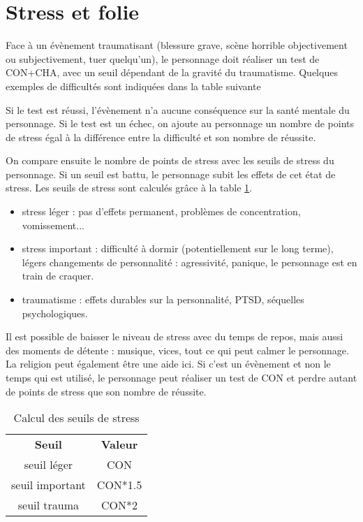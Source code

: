 \documentclass[10pt,a4paper,twocolumn]{book}
\begin{document}
\section{Stress et folie}
Face à un évènement traumatisant (blessure grave, scène horrible objectivement ou subjectivement, tuer quelqu'un), le personnage doit réaliser un test de CON+CHA, avec un seuil dépendant de la gravité du traumatisme. Quelques exemples de difficultés sont indiquées dans la table suivante %

Si le test est réussi, l'évènement n'a aucune conséquence sur la santé mentale du personnage. Si le test est un échec, on ajoute au personnage un nombre de points de stress égal à la différence entre la difficulté et son nombre de réussite.

On compare ensuite le nombre de points de stress avec les seuils de stress du personnage. Si un seuil est battu, le personnage subit les effets de cet état de stress. Les seuils de stress sont calculés grâce à la table \ref{TableauSeuilsStress}.

\begin{itemize}
\item stress léger : pas d'effets permanent, problèmes de concentration, vomissement...
\item stress important : difficulté à dormir (potentiellement sur le long terme), légers changements de personnalité : agressivité, panique, le personnage est en train de craquer.
\item traumatisme : effets durables sur la personnalité, PTSD, séquelles psychologiques.
\end{itemize}

Il est possible de baisser le niveau de stress avec du temps de repos, mais aussi des moments de détente : musique, vices, tout ce qui peut calmer le personnage. La religion peut également être une aide ici.
Si c'est un évènement et non le temps qui est utilisé, le personnage peut réaliser un test de CON et perdre autant de points de stress que son nombre de réussite.
\begin{table}
\label{TableauSeuilsStress}
\caption{Calcul des seuils de stress}
\begin{center}
\begin{tabular}{cc}
\textbf{Seuil} & \textbf{Valeur} \\
seuil léger & CON \\
seuil important & CON*1.5 \\
seuil trauma & CON*2 \\
\end{tabular}
\end{center}
\end{table}
\end{document}
